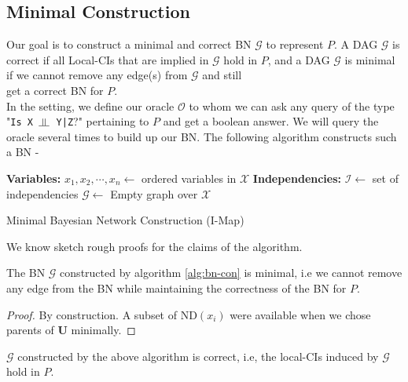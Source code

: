 \subsection{Minimal Construction}
Our goal is to construct a minimal and correct BN $\mathcal G$ to represent $P$. A DAG $\mathcal G$ is correct if all Local-CIs that are implied in $\mathcal G$ hold in $P$, and a DAG $\mathcal G$ is minimal if we cannot remove any edge(s) from $\mathcal G$ and still\\ \noindent get a correct BN for $P$.
\\In the setting, we define our oracle $\mathscr{O}$ to whom we can ask any query of the type "\texttt{Is X $\ind$ Y|Z}?" pertaining to $P$ and get a boolean answer. We will query the oracle several times to build up our BN. The following algorithm constructs such a BN - \\
\begin{algorithm}[H]\label{alg:bn-con}
	\DontPrintSemicolon
	\textbf{Variables:} $x_1, x_2, \cdots, x_n \longleftarrow$ ordered variables in $\mathcal{X}$\;
	\textbf{Independencies:} $\mathcal I \longleftarrow$ set of independencies\;
	$\mathcal G \longleftarrow$ Empty graph over $\mathcal X$\;
	
	\caption{Minimal Bayesian Network Construction (I-Map)}
\end{algorithm}
We know sketch rough proofs for the claims of the algorithm.
\begin{thm}
The BN $\mathcal G$ constructed by algorithm \ref{alg:bn-con} is minimal, i.e we cannot remove any edge from the BN while maintaining the correctness of the BN for $P$.
\end{thm}
\begin{proof}
By construction. A subset of $\text{ND}(x_i)$ were available when we chose parents of $\mathbf U$ minimally.
\end{proof}
\begin{thm}
$\mathcal{G}$ constructed by the above algorithm is correct, i.e, the local-CIs induced by $\mathcal G$ hold in $P$.
\end{thm}
